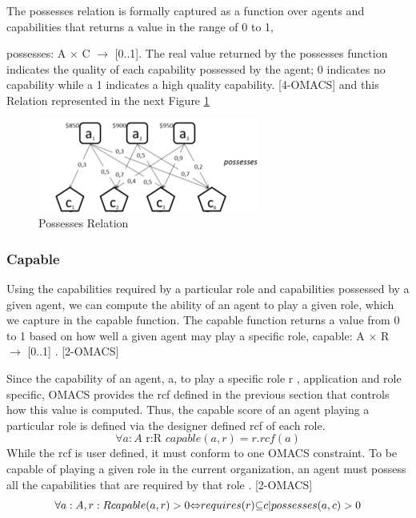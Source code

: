 The possesses relation is formally captured as a function over agents and capabilities that returns a value in the range of 0 to 1,

 possesses: A $\times$ C $\rightarrow$ [0..1]. The real value returned by the possesses function indicates the quality of each capability possessed by the agent; 0 indicates no capability while a 1 indicates a high quality capability. [4-OMACS]
and this Relation represented in the next Figure \ref{fig:Possesses Relation}


\begin{figure}[th]
	\centering
		\includegraphics{chapiter1/img/p}
	\caption{\label{fig:Possesses Relation}Possesses Relation }
\end{figure}


\subsubsection{Capable}
Using the capabilities required by a particular role and capabilities possessed by a given agent, we can compute the ability of an agent to play a given role, which we capture in the capable function. The capable function returns a value from 0 to 1 based on how well a given agent may play a specific role, capable: A $\times$ R $\rightarrow$ {[}0..1{]} . [2-OMACS]

Since the capability of an agent, a, to play a specific role  r , application and role specific, OMACS provides the rcf defined in the previous section that controls how this value is computed. Thus, the capable score of an agent playing a particular role is defined via the designer defined rcf of each role.
\begin{equation}
\forall a:A\textrm{ r:R }capable(a,r)=r.rcf(a)\label{eq:Funccapable}
\end{equation}
While the rcf is user defined, it must conform to one OMACS constraint. 
To be capable of playing a given role in the current organization,
 an agent must possess all the capabilities that are required by that role . [2-OMACS]
\begin{equation}
\text{\ensuremath{\forall}}a:A,r:Rcapable(a,r)>0\text{\ensuremath{\Leftrightarrow}}requires(r)\text{\ensuremath{\subseteq}}{c|possesses(a,c)>0}\label{eq:FuncCapable2}
\end{equation}






